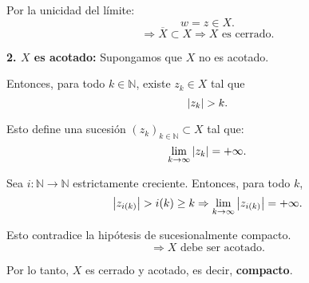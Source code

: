 {Por la unicidad del límite:
\[
	w = z \in X.
\]
\[
	\Rightarrow \overline{X} \subset X \Rightarrow X \text{ es cerrado}.
\]

\textbf{2. \(X\) es acotado:}
Supongamos que \(X\) no es acotado.

Entonces, para todo \(k \in \mathbb{N}\), existe \( z_k \in X \) tal que
\[
	\abs{z_k} > k.
\]

Esto define una sucesión \( (z_k)_{k \in \mathbb{N}} \subset X \) tal que:
\[
	\lim_{k \to \infty} \abs{z_k} = +\infty.
\]

Sea \( i \colon \mathbb{N} \to \mathbb{N} \) estrictamente creciente.
Entonces, para todo \(k\),
\[
	\abs{z_{i(k)}} > i(k) \geq k \Rightarrow \lim_{k \to \infty} \abs{z_{i(k)}} = +\infty.
\]


Esto contradice la hipótesis de sucesionalmente compacto.
\[
	\Rightarrow X \text{ debe ser acotado}.
\]

Por lo tanto, \(X\) es cerrado y acotado, es decir, \textbf{compacto}.
}



